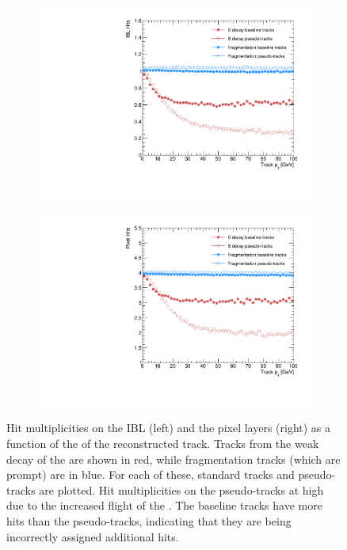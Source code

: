 %
\begin{figure}[!htbp]
    \centering
    \begin{subfigure}{.48\textwidth}
      \centering
      \includegraphics[width=\textwidth]{chapters/3.tracking/figs/overlay_po_nHitsOnIBL_From_B_pT.pdf}
    \end{subfigure}%
    \begin{subfigure}{.48\textwidth}
      \centering
      \includegraphics[width=\textwidth]{chapters/3.tracking/figs/overlay_po_nHitsOnPix_From_B_pT.pdf}
    \end{subfigure}
    \caption{
      Hit multiplicities on the IBL (left) and the pixel layers (right) as a function of the \pT of the reconstructed track.
      Tracks from the weak decay of the \bhadron are shown in red, while fragmentation tracks (which are prompt) are in blue.
      For each of these, standard tracks and pseudo-tracks are plotted.
      Hit multiplicities on the pseudo-tracks at high \pt due to the increased flight of the \bhadron. 
      The baseline tracks have more hits than the pseudo-tracks, indicating that they are being incorrectly assigned additional hits.}
    \label{fig:total hits on pix bs, frag}
\end{figure}
%



